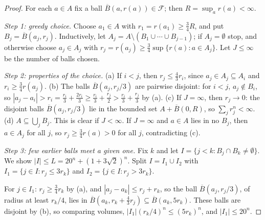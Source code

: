 \begin{proof}
For each $a \in A$ fix a ball $\overline{B}(a, r(a)) \in \mathcal{F}$; then $R = \sup_ar(a) < \infty$.

\emph{Step 1: greedy choice.} Choose $a_1 \in A$ with $r_1 = r(a_1) \geq \frac34R$, and put $B_j = \overline{B}(a_j, r_j)$. Inductively, let $A_j = A \setminus (B_1 \cup \cdots \cup B_{j-1})$; if $A_j = \emptyset$ stop,
and otherwise choose $a_j \in A_j$ with $r_j = r(a_j) \geq \frac34\sup\{r(a) : a \in A_j\}$. Let $J \leq \infty$ be the number of balls chosen.

\emph{Step 2: properties of the choice.} (a) If $i < j$, then $r_j \leq \frac43r_i$, since $a_j \in A_j \subseteq A_i$ and $r_i \geq \frac34r(a_j)$.
(b) The balls $\overline{B}(a_j, r_j/3)$ are pairwise disjoint: for $i < j$, $a_j \notin B_i$, so $|a_j - a_i| > r_i = \frac{r_i}3 + \frac{2r_i}3 \geq \frac{r_i}3 + \frac{r_j}2 > \frac{r_i}3 + \frac{r_j}3$ by (a).
(c) If $J = \infty$, then $r_j \to 0$: the disjoint balls $\overline{B}(a_j, r_j/3)$ lie in the bounded set $A + \overline{B}(0, R)$, so $\sum_jr_j^n < \infty$.
(d) $A \subseteq \bigcup_jB_j$. This is clear if $J < \infty$. If $J = \infty$ and $a \in A$ lies in no $B_j$, then $a \in A_j$ for all $j$, so $r_j \geq \frac34r(a) > 0$ for all $j$, contradicting (c).

\emph{Step 3: few earlier balls meet a given one.} Fix $k$ and let $I = \{j < k : B_j \cap B_k \neq \emptyset\}$. We show $|I| \leq L = 20^n + (1 + 3\sqrt2)^n$. Split
$I = I_1 \cup I_2$ with $I_1 = \{j \in I : r_j \leq 3r_k\}$ and $I_2 = \{j \in I : r_j > 3r_k\}$.

For $j \in I_1$: $r_j \geq \frac34r_k$ by (a), and $|a_j - a_k| \leq r_j + r_k$, so the ball $\overline{B}(a_j, r_j/3)$, of radius at least $r_k/4$, lies in
$\overline{B}(a_k, r_k + \frac43r_j) \subseteq \overline{B}(a_k, 5r_k)$. These balls are disjoint by (b), so comparing volumes, $|I_1|(r_k/4)^n \leq (5r_k)^n$, and $|I_1| \leq 20^n$.


\end{proof}

